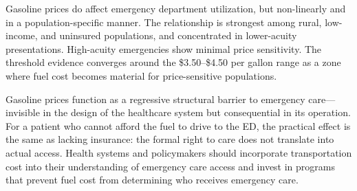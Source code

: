 \documentclass[12pt, a4paper]{article}
\begin{document}
Gasoline prices do affect emergency department utilization, but non-linearly and in a population-specific manner. The relationship is strongest among rural, low-income, and uninsured populations, and concentrated in lower-acuity presentations. High-acuity emergencies show minimal price sensitivity. The threshold evidence converges around the \$3.50--\$4.50 per gallon range as a zone where fuel cost becomes material for price-sensitive populations.

Gasoline prices function as a regressive structural barrier to emergency care---invisible in the design of the healthcare system but consequential in its operation. For a patient who cannot afford the fuel to drive to the ED, the practical effect is the same as lacking insurance: the formal right to care does not translate into actual access. Health systems and policymakers should incorporate transportation cost into their understanding of emergency care access and invest in programs that prevent fuel cost from determining who receives emergency care.



\end{document}
